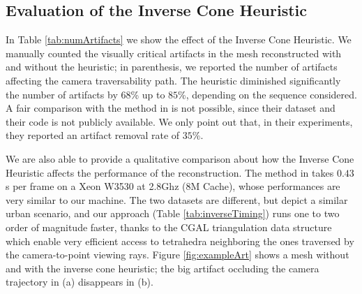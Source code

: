 

\subsection{Evaluation of the Inverse Cone Heuristic}
In Table \ref{tab:numArtifacts} we show the effect of the Inverse Cone Heuristic. We manually counted the visually critical artifacts in the mesh reconstructed with and without the heuristic; in parenthesis, we reported the number of artifacts affecting the camera traversability path. The heuristic diminished significantly the number of artifacts by $68$\% up to $85$\%, depending on the sequence considered. 
A fair comparison with the method in \cite{litvinov_Lhiuller14} is not possible, since their dataset and their code is not publicly available. We only point out that, in their experiments, they reported \cite{litvinov_Lhiuller14} an artifact removal rate of $35$\%.


We are also able to provide a qualitative comparison about how the Inverse Cone Heuristic affects the performance of the reconstruction. The method in \cite{litvinov_Lhiuller14} takes $0.43$s per frame on a Xeon W3530 at 2.8Ghz (8M Cache), whose performances are very similar to our machine.  The two datasets are different, but depict a similar urban scenario, and our approach (Table \ref{tab:inverseTiming}) runs one to two order of magnitude faster, thanks to the CGAL \cite{cgal} triangulation data structure which enable very efficient access to  tetrahedra neighboring the ones traversed by the camera-to-point viewing rays. 
Figure \ref{fig:exampleArt} shows a mesh without and with the inverse cone heuristic; the big artifact occluding the camera trajectory in (a) disappears in (b).
 


